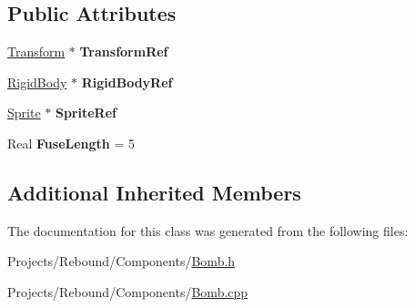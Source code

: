 \subsection*{Public Attributes}
\begin{DoxyCompactItemize}
\item 
\hypertarget{classDCEngine_1_1Components_1_1Bomb_acb562ab47d537d6ed59dee052f6ec73c}{\hyperlink{classDCEngine_1_1Components_1_1Transform}{Transform} $\ast$ {\bfseries Transform\-Ref}}\label{classDCEngine_1_1Components_1_1Bomb_acb562ab47d537d6ed59dee052f6ec73c}

\item 
\hypertarget{classDCEngine_1_1Components_1_1Bomb_ace9498b2b5ee502b8da3fae0229ff8a1}{\hyperlink{classDCEngine_1_1Components_1_1RigidBody}{Rigid\-Body} $\ast$ {\bfseries Rigid\-Body\-Ref}}\label{classDCEngine_1_1Components_1_1Bomb_ace9498b2b5ee502b8da3fae0229ff8a1}

\item 
\hypertarget{classDCEngine_1_1Components_1_1Bomb_ae287c4907933e00077c8df40613cbfee}{\hyperlink{classDCEngine_1_1Components_1_1Sprite}{Sprite} $\ast$ {\bfseries Sprite\-Ref}}\label{classDCEngine_1_1Components_1_1Bomb_ae287c4907933e00077c8df40613cbfee}

\item 
\hypertarget{classDCEngine_1_1Components_1_1Bomb_a2623f8cbb5d8356d8c2a28c80e7c39b3}{Real {\bfseries Fuse\-Length} = 5}\label{classDCEngine_1_1Components_1_1Bomb_a2623f8cbb5d8356d8c2a28c80e7c39b3}

\end{DoxyCompactItemize}
\subsection*{Additional Inherited Members}


The documentation for this class was generated from the following files\-:\begin{DoxyCompactItemize}
\item 
Projects/\-Rebound/\-Components/\hyperlink{Bomb_8h}{Bomb.\-h}\item 
Projects/\-Rebound/\-Components/\hyperlink{Bomb_8cpp}{Bomb.\-cpp}\end{DoxyCompactItemize}
